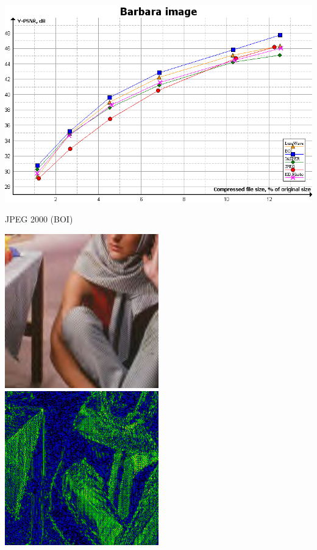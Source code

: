 \documentclass{beamer}
\begin{document}
\begin{frame}
   \includegraphics[width=\textwidth]{figure/barbara_psnr.png}
\end{frame}
\begin{frame}{JPEG 2000 (BOI)}
   \begin{multicols}{2}
      \includegraphics[width=0.5\textwidth]{figure/BOI_barbara010.jpg}
      \includegraphics[width=0.5\textwidth]{figure/psnr_BOI_barbara010.png}
   \end{multicols}
\end{frame}
\end{document}
